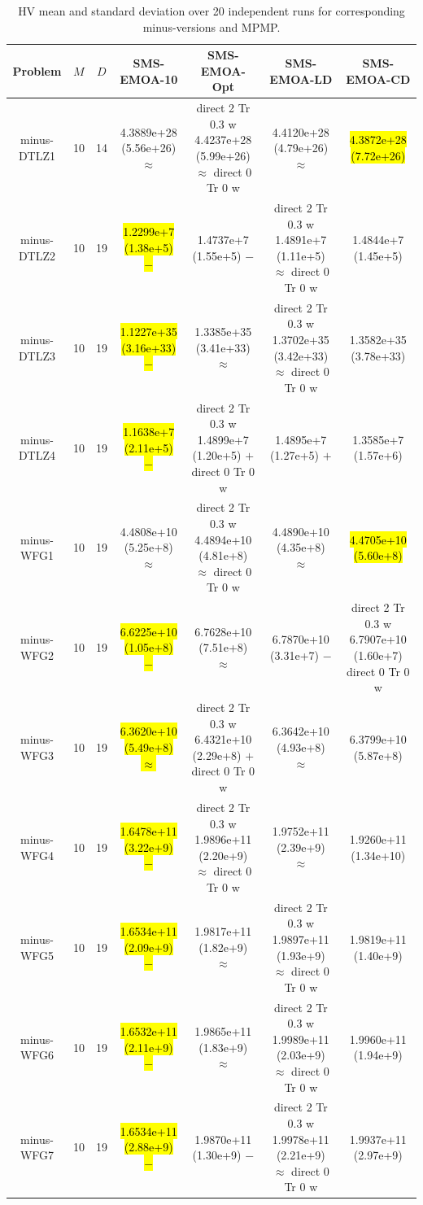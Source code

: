 \documentclass[conference]{IEEEtran}
\newcommand{\semitextbf}[1]{%
	\pdfliteral direct {2 Tr 0.3 w} %
	#1%
	\pdfliteral direct {0 Tr 0 w}%
}
\begin{document}
\begin{table}[!t]\footnotesize
    \caption{HV mean and standard deviation over 20 independent runs for corresponding minus-versions and MPMP.} %
    \label{table_itri}
    \centering
    \begin{tabular}{ccccccc}
      \toprule
      Problem&$M$&$D$&SMS-EMOA-10&SMS-EMOA-Opt&SMS-EMOA-LD&SMS-EMOA-CD\\ 
      \midrule
      \multirow{1}{*}{minus-DTLZ1}&10&14&4.3889e+28 (5.56e+26) $\approx$&\semitextbf{4.4237e+28 (5.99e+26) $\approx$}&4.4120e+28 (4.79e+26) $\approx$&\hl{4.3872e+28 (7.72e+26)}\\
      \multirow{1}{*}{minus-DTLZ2}&10&19&\hl{1.2299e+7 (1.38e+5) $-$}&1.4737e+7 (1.55e+5) $-$&\semitextbf{1.4891e+7 (1.11e+5) $\approx$}&1.4844e+7 (1.45e+5)\\
      \multirow{1}{*}{minus-DTLZ3}&10&19&\hl{1.1227e+35 (3.16e+33) $-$}&1.3385e+35 (3.41e+33) $\approx$&\semitextbf{1.3702e+35 (3.42e+33) $\approx$}&1.3582e+35 (3.78e+33)\\
      \multirow{1}{*}{minus-DTLZ4}&10&19&\hl{1.1638e+7 (2.11e+5) $-$}&\semitextbf{1.4899e+7 (1.20e+5) $+$}&1.4895e+7 (1.27e+5) $+$&1.3585e+7 (1.57e+6)\\
      \hline
      \multirow{1}{*}{minus-WFG1}&10&19&4.4808e+10 (5.25e+8) $\approx$&\semitextbf{4.4894e+10 (4.81e+8) $\approx$}&4.4890e+10 (4.35e+8) $\approx$&\hl{4.4705e+10 (5.60e+8)}\\
      \multirow{1}{*}{minus-WFG2}&10&19&\hl{6.6225e+10 (1.05e+8) $-$}&6.7628e+10 (7.51e+8) $\approx$&6.7870e+10 (3.31e+7) $-$&\semitextbf{6.7907e+10 (1.60e+7)}\\
      \multirow{1}{*}{minus-WFG3}&10&19&\hl{6.3620e+10 (5.49e+8) $\approx$}&\semitextbf{6.4321e+10 (2.29e+8) $+$}&6.3642e+10 (4.93e+8) $\approx$&6.3799e+10 (5.87e+8)\\
      \multirow{1}{*}{minus-WFG4}&10&19&\hl{1.6478e+11 (3.22e+9) $-$}&\semitextbf{1.9896e+11 (2.20e+9) $\approx$}&1.9752e+11 (2.39e+9) $\approx$&1.9260e+11 (1.34e+10)\\
      \multirow{1}{*}{minus-WFG5}&10&19&\hl{1.6534e+11 (2.09e+9) $-$}&1.9817e+11 (1.82e+9) $\approx$&\semitextbf{1.9897e+11 (1.93e+9) $\approx$}&1.9819e+11 (1.40e+9)\\
      \multirow{1}{*}{minus-WFG6}&10&19&\hl{1.6532e+11 (2.11e+9) $-$}&1.9865e+11 (1.83e+9) $\approx$&\semitextbf{1.9989e+11 (2.03e+9) $\approx$}&1.9960e+11 (1.94e+9)\\
      \multirow{1}{*}{minus-WFG7}&10&19&\hl{1.6534e+11 (2.88e+9) $-$}&1.9870e+11 (1.30e+9) $-$&\semitextbf{1.9978e+11 (2.21e+9) $\approx$}&1.9937e+11 (2.97e+9)\\

\end{tabular}
\end{table}
\end{document}
